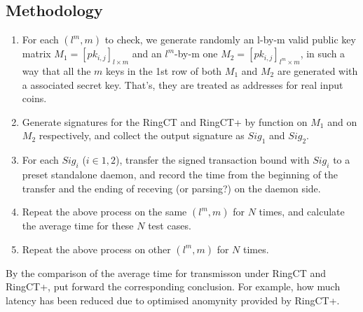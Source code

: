 \subsection{Methodology}
	\begin{enumerate}
		\item For each \( (l^m,m)\) to check, we generate randomly an l-by-m valid public key matrix \(M_1= [pk_{i,j}]_{l\times m}\) and an \(l^m\)-by-m one \(M_2=[pk_{i,j}]_{l^m\times m}\), in such a way that all the \(m\) keys in the 1st row of both \(M_1\) and \(M_2\) are generated with a associated secret key. That's, they are treated as addresses for real input coins.
		\item Generate signatures for the RingCT and RingCT+ by function  on \(M_1\) and  on \(M_2\) respectively, and collect the output signature as \(Sig_1\) and \(Sig_2\).
		\item For each \(Sig_i\) (\(i\in {1,2}\)), transfer the signed transaction bound with \(Sig_i\) to a preset standalone daemon, and record the time from the beginning of the transfer and the ending of receving (or parsing?) on the daemon side.
		\item Repeat the above process on the same \( (l^m,m)\) for \(N\) times, and calculate the average time for these \(N\) test cases.
		\item Repeat the above process on other \( (l^m,m)\) for \(N\) times.
	\end{enumerate}
	By the comparison of the average time for transmisson under RingCT and RingCT+, put forward the corresponding conclusion. For example, how much latency has been reduced due to optimised anomynity provided by RingCT+.
